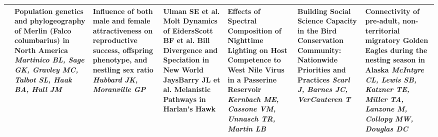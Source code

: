 \begin{tabular}{|x{0.75cm}|x{2.25cm}|x{2.25cm}|x{2.25cm}|a{2.25cm}|a{2.25cm}|a{2.25cm}|}
&Population genetics and phylogeography of Merlin (Falco columbarius) in North America \newline \newline \textit{Martinico BL, Sage GK, Gravley MC, Talbot SL, Haak BA, Hull JM} & Influence of both male and female attractiveness on reproductive success, offspring phenotype, and nestling sex ratio \newline \newline \textit{Hubbard JK, Moranville GP} & \scriptsize Ulman SE et al. \newline \tiny Molt Dynamics of Eiders\newline \newline \scriptsize Scott BF et al. \newline \tiny Bill Divergence and Speciation in New World Jays\newline \newline \scriptsize Barry JL et al. \newline \tiny Melanistic Pathways in Harlan's Hawk & Effects of Spectral Composition of Nighttime Lighting on Host Competence to West Nile Virus in a Passerine Reservoir \newline \newline \textit{Kernbach ME, Cassone VM, Unnasch TR, Martin LB} & Building Social Science Capacity in the Bird Conservation Community: Nationwide Priorities and Practices \newline \newline \textit{Scarl J, Barnes JC, VerCauteren T} & Connectivity of pre-adult, non-territorial migratory Golden Eagles during the nesting season in Alaska \newline \newline \textit{McIntyre CL, Lewis SB, Katzner TE, Miller TA, Lanzone M, Collopy MW, Douglas DC}\\
\hline

\end{tabular}
